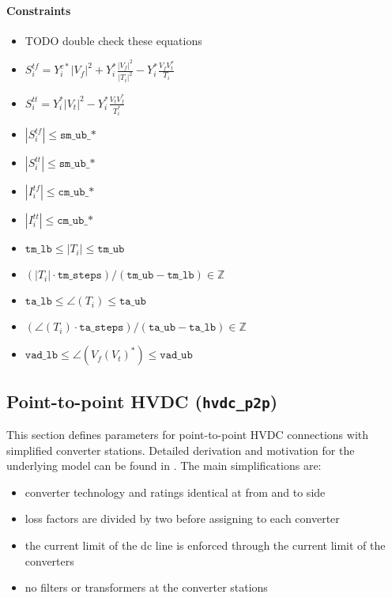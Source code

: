 \documentclass{article}
\begin{document}
\paragraph{Constraints}
\begin{itemize}
    \item {\color{red} TODO double check these equations}
    \item $S^{tf}_i = Y^{c*}_i |V_f|^2 + Y^*_i \frac{|V_f|^2}{|T_i|^2} - Y_i^* \frac{V_f V^*_t}{T_i}$
    \item $S^{tt}_i = Y_i^* |V_t|^2 - Y_i^* \frac{V_t V^*_f}{T_i^*}$ 
    \item $|S^{tf}_i| \leq \texttt{sm\_ub\_*}$
    \item $|S^{tt}_i| \leq \texttt{sm\_ub\_*}$
    \item $|I^{tf}_i| \leq \texttt{cm\_ub\_*}$
    \item $|I^{tt}_i| \leq \texttt{cm\_ub\_*}$
    \item $\texttt{tm\_lb} \leq |T_i| \leq \texttt{tm\_ub}$
    \item $ (|T_i| \cdot \texttt{tm\_steps}) / (\texttt{tm\_ub} - \texttt{tm\_lb}) \in \mathbb{Z} $
    \item $\texttt{ta\_lb} \leq \angle(T_i) \leq \texttt{ta\_ub}$
    \item $ (\angle(T_i) \cdot \texttt{ta\_steps}) / (\texttt{ta\_ub} - \texttt{ta\_lb}) \in \mathbb{Z} $
    \item $\texttt{vad\_lb} \leq \angle(V_f  (V_t)^* ) \leq \texttt{vad\_ub}$
\end{itemize}


\subsection{Point-to-point HVDC  (\texttt{hvdc\_p2p})}
This section defines parameters for point-to-point HVDC connections with simplified converter stations.
Detailed derivation and motivation for the underlying model can be found in \cite{Ergun2019}. 
The main simplifications are:
\begin{itemize}
    \item converter technology and ratings identical at from and to side
    \item loss factors are divided by two before assigning to each converter
    \item the current limit of the dc line is enforced through the current limit of the converters
    \item no filters or transformers at the converter stations
\end{itemize}
\end{document}
